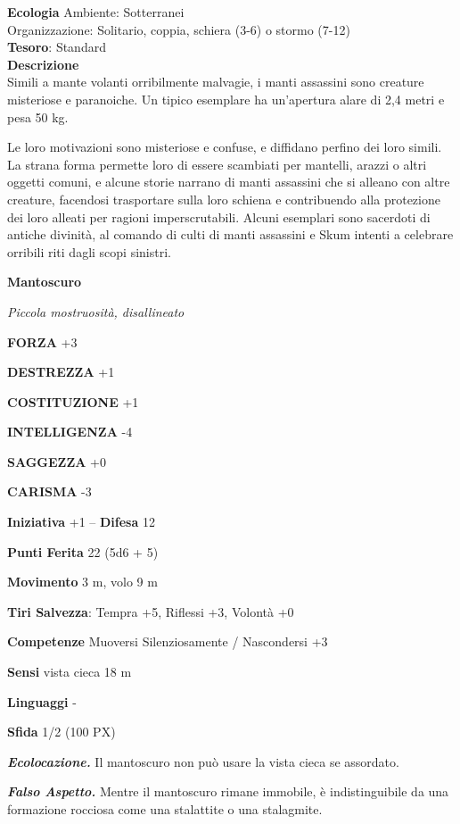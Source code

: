 \begin{multicols}{2}
\textbf{Ecologia}
Ambiente: Sotterranei\\
Organizzazione: Solitario, coppia, schiera (3-6) o stormo (7-12)\\
\textbf{Tesoro}: Standard\\
\textbf{Descrizione}\\
Simili a mante volanti orribilmente malvagie, i manti assassini sono creature misteriose e paranoiche. Un tipico esemplare ha un'apertura alare di 2,4 metri e pesa 50 kg.

Le loro motivazioni sono misteriose e confuse, e diffidano perfino dei loro simili. La strana forma permette loro di essere scambiati per mantelli, arazzi o altri oggetti comuni, e alcune storie narrano di manti assassini che si alleano con altre creature, facendosi trasportare sulla loro schiena e contribuendo alla protezione dei loro alleati per ragioni imperscrutabili. Alcuni esemplari sono sacerdoti di antiche divinità, al comando di culti di manti assassini e Skum intenti a celebrare orribili riti dagli scopi sinistri.


\medskip{}\textbf{Mantoscuro}

\textit{Piccola mostruosità, disallineato}

\textbf{FORZA} +3

\textbf{DESTREZZA} +1

\textbf{COSTITUZIONE} +1

\textbf{INTELLIGENZA} -4

\textbf{SAGGEZZA} +0

\textbf{CARISMA} -3

\textbf{Iniziativa} +1 -- \textbf{Difesa} 12

\textbf{Punti Ferita} 22 (5d6 + 5)

\textbf{Movimento} 3 m, volo 9 m

\textbf{Tiri Salvezza}: Tempra +5, Riflessi +3, Volontà +0

\textbf{Competenze} Muoversi Silenziosamente / Nascondersi +3

\textbf{Sensi} vista cieca 18 m

\textbf{Linguaggi} -

\textbf{Sfida} 1/2 (100 PX)

\textit{\textbf{Ecolocazione.}} Il mantoscuro non può usare la vista cieca se assordato.

\textit{\textbf{Falso Aspetto.}} Mentre il mantoscuro rimane immobile, è indistinguibile da una formazione rocciosa come una stalattite o una stalagmite.


\end{multicols}
